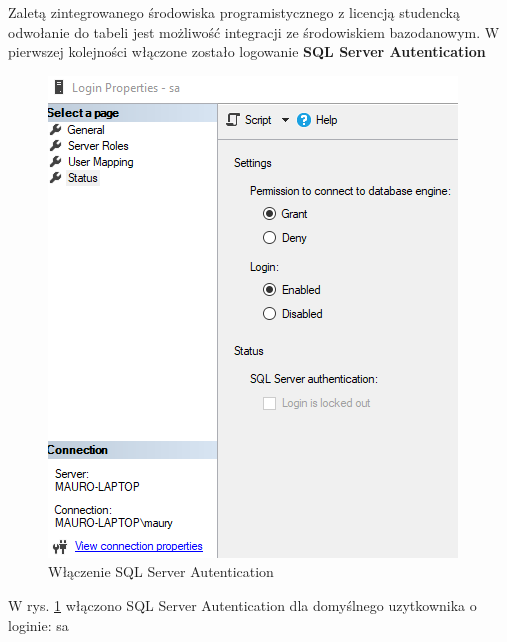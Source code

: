Zaletą zintegrowanego środowiska programistycznego z licencją studencką {odwołanie do tabeli} jest możliwość integracji ze środowiskiem bazodanowym.
W pierwszej kolejności włączone zostało logowanie \textbf{SQL Server Autentication}

\begin{figure}[h]
		\centering
    \includegraphics[scale=0.6]{rys05/login_prop.png}
    \caption{Włączenie SQL Server Autentication}
    \label{auth_etykieta}
\end{figure}

W rys. \ref{auth_etykieta} włączono SQL Server Autentication dla domyślnego uzytkownika o loginie: sa

